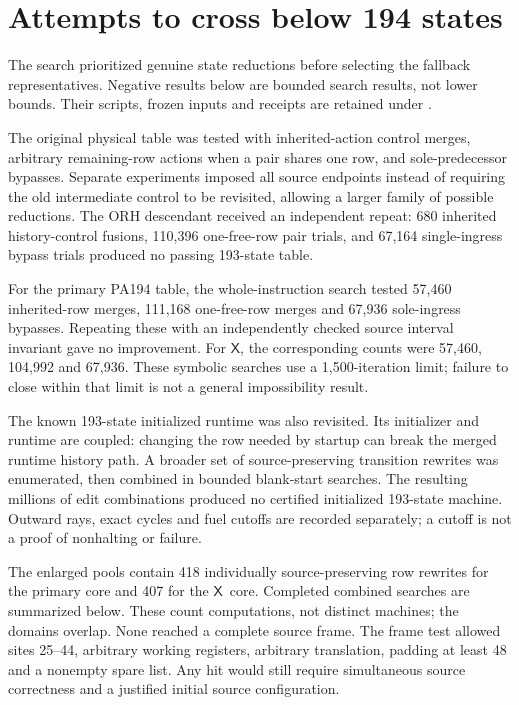 \documentclass[11pt]{article}
\newcommand{\X}{\ensuremath{\mathsf X}}
\newcommand{\file}[1]{\path{#1}}
\begin{document}
\section{Attempts to cross below 194 states}
\label{sec:search}

The search prioritized genuine state reductions before selecting the
fallback representatives. Negative results below are bounded search
results, not lower bounds. Their scripts, frozen inputs and receipts
are retained under \file{research/}.

The original physical table was tested with inherited-action control
merges, arbitrary remaining-row actions when a pair shares one row,
and sole-predecessor bypasses. Separate experiments imposed all
source endpoints instead of requiring the old intermediate control
to be revisited, allowing a larger family of possible reductions.
The ORH descendant received an independent repeat: 680 inherited
history-control fusions, 110,396 one-free-row pair trials, and 67,164
single-ingress bypass trials produced no passing 193-state table.

For the primary PA194 table, the whole-instruction search tested
57,460 inherited-row merges, 111,168 one-free-row merges and 67,936
sole-ingress bypasses. Repeating these with an independently checked
source interval invariant gave no improvement. For \X, the corresponding
counts were 57,460, 104,992 and 67,936. These symbolic searches use a
1,500-iteration limit; failure to close within that limit is not a
general impossibility result.

The known 193-state initialized runtime was also revisited. Its
initializer and runtime are coupled: changing the row needed by
startup can break the merged runtime history path. A broader set of
source-preserving transition rewrites was enumerated, then combined
in bounded blank-start searches. The resulting millions of edit
combinations produced no certified initialized 193-state machine.
Outward rays, exact cycles and fuel cutoffs are recorded separately;
a cutoff is not a proof of nonhalting or failure.

The enlarged pools contain 418 individually source-preserving row
rewrites for the primary core and 407 for the \X\ core. Completed
combined searches are summarized below. These count computations,
not distinct machines; the domains overlap. None reached a complete
source frame. The frame test allowed sites 25--44, arbitrary working
registers, arbitrary translation, padding at least 48 and a nonempty
spare list. Any hit would still require simultaneous source correctness
and a justified initial source configuration.
\end{document}
